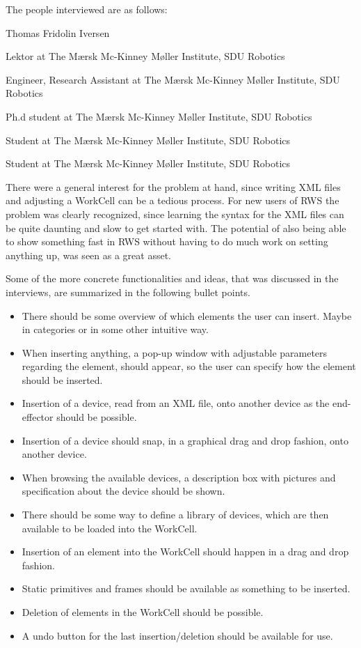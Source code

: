 The people interviewed are as follows:

\begin{labeling}{Thomas Fridolin Iversen}
\item [Lars-Peter Ellekilde] Lektor at The Mærsk Mc-Kinney Møller Institute, SDU Robotics
\item [Thomas Nicky Thuelsen] Engineer, Research Assistant at The Mærsk Mc-Kinney Møller Institute, SDU Robotics
\item [Thomas Fridolin Iversen] Ph.d student at The Mærsk Mc-Kinney Møller Institute, SDU Robotics
\item [Michael Kjær Schmidt] Student at The Mærsk Mc-Kinney Møller Institute, SDU Robotics
\item [Kristian Møller Hansen] Student at The Mærsk Mc-Kinney Møller Institute, SDU Robotics
\end{labeling}

There were a general interest for the problem at hand, since writing XML files and adjusting a WorkCell can be a tedious process. For new users of RWS the problem was clearly recognized, since learning the syntax for the XML files can be quite daunting and slow to get started with. The potential of also being able to show something fast in RWS without having to do much work on setting anything up, was seen as a great asset.

Some of the more concrete functionalities and ideas, that was discussed in the interviews, are summarized in the following bullet points.

\begin{itemize}
\item There should be some overview of which elements the user can insert. Maybe in categories or in some other intuitive way.
\item When inserting anything, a pop-up window with adjustable parameters regarding the element, should appear, so the user can specify how the element should be inserted.
\item Insertion of a device, read from an XML file, onto another device as the end-effector should be possible.
\item Insertion of a device should snap, in a graphical drag and drop fashion, onto another device.
\item When browsing the available devices, a description box with pictures and specification about the device should be shown.
\item There should be some way to define a library of devices, which are then available to be loaded into the WorkCell.
\item Insertion of an element into the WorkCell should happen in a drag and drop fashion.
\item Static primitives and frames should be available as something to be inserted.
\item Deletion of elements in the WorkCell should be possible.
\item A undo button for the last insertion/deletion should be available for use.
\end{itemize}

